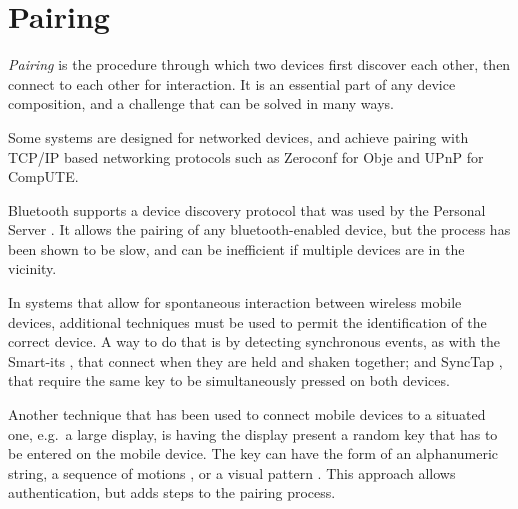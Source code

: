 %

\section{Pairing}
\label{sec:rwpairing}

\emph{Pairing} is the procedure through which two devices first discover each other, then connect to each other for interaction.
It is an essential part of any device composition, and a challenge that can be solved in many ways.

Some systems are designed for networked devices, and achieve pairing with TCP/IP based networking protocols such as Zeroconf \citeyearpar{zeroconf} for Obje and UPnP \citeyearpar{upnp} for CompUTE.

Bluetooth \citeyearpar{bluetooth} supports a device discovery protocol that was used by the Personal Server \citep{Want:2002:personalserver}.
It allows the pairing of any bluetooth-enabled device, but the process has been shown to be slow, and can be inefficient if multiple devices are in the vicinity.

In systems that allow for spontaneous interaction between wireless mobile devices, additional techniques must be used to permit the identification of the correct device.
A way to do that is by detecting synchronous events, as with the Smart-its \citep{Holmquist:2001:smartits}, that connect when they are held and shaken together; and SyncTap \citep{Rekimoto:2003:synctap}, that require the same key to be simultaneously pressed on both devices.

Another technique that has been used to connect mobile devices to a situated one, e.g.\ a large display, is having the display present a random key that has to be entered on the mobile device.
The key can have the form of an alphanumeric string, a sequence of motions \citep{Patel:2004:mobileauth}, or a visual pattern \citep{Ballagas:2005:sweeppointshoot, Scott:2005:visualauth}.
This approach allows authentication, but adds steps to the pairing process.

